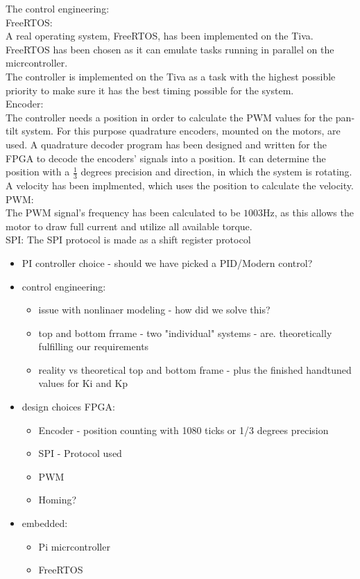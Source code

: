 \documentclass[../../main]{subfiles}
\begin{document}
The control engineering: \\

FreeRTOS:\\
A real operating system, FreeRTOS, has been implemented on the Tiva. FreeRTOS has been chosen as it can emulate tasks running in parallel on the micrcontroller. \\
The controller is implemented on the Tiva as a task with the highest possible priority to make sure it has the best timing possible for the system.
\\

Encoder:\\
The controller needs a position in order to calculate the PWM values for the pan-tilt system. For this purpose quadrature encoders, mounted on the motors, are used.
A quadrature decoder program has been designed and written for the FPGA to decode the encoders' signals into a position.
It can determine the position with a $\frac{1}{3}$ degrees precision and direction, in which the system is rotating. A velocity has been implmented, which uses the position to calculate the velocity.
\\

PWM:\\
The PWM signal's frequency has been calculated to be $1003$Hz, as this allows the motor to draw full current and utilize all available torque. \\

SPI:
The SPI protocol is made as a shift register protocol


\begin{itemize}
  \item PI controller choice - should we have picked a PID/Modern control?
  \item control engineering:
  \begin{itemize}
    \item issue with nonlinaer modeling - how did we solve this?
    \item top and bottom frrame - two "individual" systems - are. theoretically fulfilling our requirements
    \item reality vs theoretical top and bottom frame - plus the finished handtuned values for Ki and Kp
  \end{itemize}
  \item design choices FPGA:
    \begin{itemize}
      \item Encoder - position counting with 1080 ticks or 1/3 degrees precision
      \item SPI - Protocol used
      \item PWM
      \item Homing?
    \end{itemize}
  \item embedded:
  \begin{itemize}
    \item Pi micrcontroller
    \item FreeRTOS
  \end{itemize}


\end{itemize}
\end{document}
